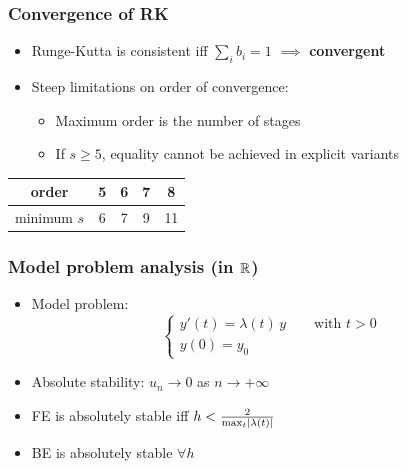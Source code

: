 \documentclass{beamer}
\begin{document}
\begin{frame} %
\frametitle{Convergence of RK}
	\begin{itemize}
		\item Runge-Kutta is consistent iff $\sum_i b_i = 1$ $\implies$ \textbf{convergent}
		\item Steep limitations on order of convergence:
		\begin{itemize}
			\item Maximum order is the number of stages
			\item If $s \ge 5$, equality cannot be achieved in explicit variants \\[30pt]
		\end{itemize}
	\end{itemize}
	\begin{center}
		\begin{tabular}{c|cccc}
			order & 5 & 6 & 7 & 8\\
			\hline
			minimum $s$ & 6 & 7 & 9 & 11 
		\end{tabular}
	\end{center}
\end{frame}


\begin{frame} %
\frametitle{Model problem analysis (in $\mathbb R$)}
	\begin{itemize}
		\item Model problem:
		$$
		\begin{cases}
		y'(t) = \lambda(t) \, y \qquad \text{with } t > 0 \\
		y(0) = y_0
		\end{cases}
		$$
		\item Absolute stability: $u_n \to 0$ as $n \to +\infty$
		\item FE is absolutely stable iff $h < \frac{2}{\max_t \lvert\lambda(t)\rvert} $
		\item BE is absolutely stable $\forall h$
	\end{itemize}
\end{frame}
\end{document}
